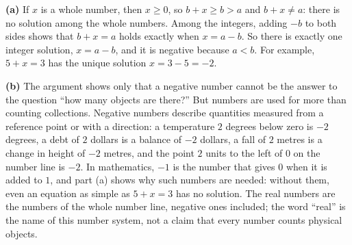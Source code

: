 \textbf{(a)} If $x$ is a whole number, then $x\ge0$, so $b+x\ge b>a$ and $b+x\ne a$: there is no solution among the whole numbers. Among the integers, adding $-b$ to both sides shows that $b+x=a$ holds exactly when $x=a-b$. So there is exactly one integer solution, $x=a-b$, and it is negative because $a<b$. For example, $5+x=3$ has the unique solution $x=3-5=\boxed{-2}$.

\textbf{(b)} The argument shows only that a negative number cannot be the answer to the question ``how many objects are there?'' But numbers are used for more than counting collections. Negative numbers describe quantities measured from a reference point or with a direction: a temperature $2$ degrees below zero is $-2$ degrees, a debt of $2$ dollars is a balance of $-2$ dollars, a fall of $2$ metres is a change in height of $-2$ metres, and the point $2$ units to the left of $0$ on the number line is $-2$. In mathematics, $-1$ is the number that gives $0$ when it is added to $1$, and part (a) shows why such numbers are needed: without them, even an equation as simple as $5+x=3$ has no solution. The real numbers are the numbers of the whole number line, negative ones included; the word ``real'' is the name of this number system, not a claim that every number counts physical objects.
